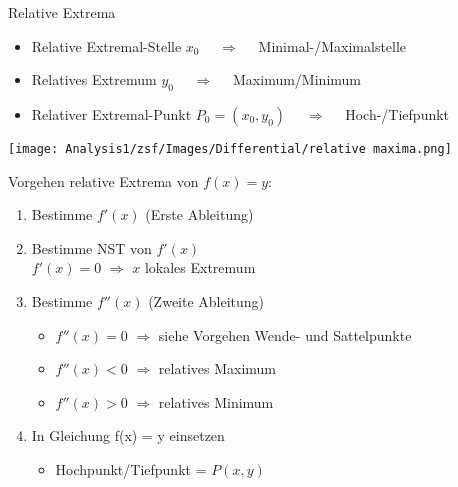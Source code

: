 \begin{definition}{Relative Extrema}
    \begin{itemize}
      \item Relative Extremal-Stelle $x_0$ $\quad \Longrightarrow \quad$ Minimal-/Maximalstelle
    
      \item Relatives Extremum $y_0$ $\quad \Longrightarrow \quad$ Maximum/Minimum
    
      \item Relativer Extremal-Punkt $P_0 = (x_0, y_0)$ $\quad \Longrightarrow \quad$ Hoch-/Tiefpunkt
    
    \end{itemize}
\end{definition}

\texttt{[image: Analysis1/zsf/Images/Differential/relative maxima.png]}

\begin{KR}{Vorgehen relative Extrema} von $f(x) = y$:
    \begin{enumerate}
	\item Bestimme $f'(x)$ (Erste Ableitung)
	\item Bestimme NST von $f'(x)$\\
		$f'(x) = 0$ $ \Rightarrow$ $x$ lokales Extremum
	\item Bestimme $f''(x)$ (Zweite Ableitung)
		\begin{itemize}
			\item $f''(x) = 0$ $ \Rightarrow$ siehe Vorgehen Wende- und Sattelpunkte
			\item $f''(x) < 0$ $ \Rightarrow$ relatives Maximum
			\item $f''(x) > 0$ $ \Rightarrow$ relatives Minimum
		\end{itemize}
    \item In Gleichung f(x) = y einsetzen
        \begin{itemize}
            \item Hochpunkt/Tiefpunkt = $P(x, y)$
        \end{itemize}
\end{enumerate}
\end{KR}

